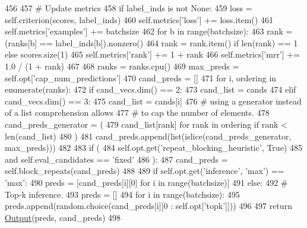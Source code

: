 \begin{DoxyCode}
456 
457         \textcolor{comment}{# Update metrics}
458         \textcolor{keywordflow}{if} label\_inds \textcolor{keywordflow}{is} \textcolor{keywordflow}{not} \textcolor{keywordtype}{None}:
459             loss = self.criterion(scores, label\_inds)
460             self.metrics[\textcolor{stringliteral}{'loss'}] += loss.item()
461             self.metrics[\textcolor{stringliteral}{'examples'}] += batchsize
462             \textcolor{keywordflow}{for} b \textcolor{keywordflow}{in} range(batchsize):
463                 rank = (ranks[b] == label\_inds[b]).nonzero()
464                 rank = rank.item() \textcolor{keywordflow}{if} len(rank) == 1 \textcolor{keywordflow}{else} scores.size(1)
465                 self.metrics[\textcolor{stringliteral}{'rank'}] += 1 + rank
466                 self.metrics[\textcolor{stringliteral}{'mrr'}] += 1.0 / (1 + rank)
467 
468         ranks = ranks.cpu()
469         max\_preds = self.opt[\textcolor{stringliteral}{'cap\_num\_predictions'}]
470         cand\_preds = []
471         \textcolor{keywordflow}{for} i, ordering \textcolor{keywordflow}{in} enumerate(ranks):
472             \textcolor{keywordflow}{if} cand\_vecs.dim() == 2:
473                 cand\_list = cands
474             \textcolor{keywordflow}{elif} cand\_vecs.dim() == 3:
475                 cand\_list = cands[i]
476             \textcolor{comment}{# using a generator instead of a list comprehension allows}
477             \textcolor{comment}{# to cap the number of elements.}
478             cand\_preds\_generator = (
479                 cand\_list[rank] \textcolor{keywordflow}{for} rank \textcolor{keywordflow}{in} ordering \textcolor{keywordflow}{if} rank < len(cand\_list)
480             )
481             cand\_preds.append(list(islice(cand\_preds\_generator, max\_preds)))
482 
483         \textcolor{keywordflow}{if} (
484             self.opt.get(\textcolor{stringliteral}{'repeat\_blocking\_heuristic'}, \textcolor{keyword}{True})
485             \textcolor{keywordflow}{and} self.eval\_candidates == \textcolor{stringliteral}{'fixed'}
486         ):
487             cand\_preds = self.block\_repeats(cand\_preds)
488 
489         \textcolor{keywordflow}{if} self.opt.get(\textcolor{stringliteral}{'inference'}, \textcolor{stringliteral}{'max'}) == \textcolor{stringliteral}{'max'}:
490             preds = [cand\_preds[i][0] \textcolor{keywordflow}{for} i \textcolor{keywordflow}{in} range(batchsize)]
491         \textcolor{keywordflow}{else}:
492             \textcolor{comment}{# Top-k inference.}
493             preds = []
494             \textcolor{keywordflow}{for} i \textcolor{keywordflow}{in} range(batchsize):
495                 preds.append(random.choice(cand\_preds[i][0 : self.opt[\textcolor{stringliteral}{'topk'}]]))
496 
497         \textcolor{keywordflow}{return} \hyperlink{namespaceparlai_1_1agents_1_1legacy__agents_1_1seq2seq_1_1torch__agent__v1_a2689006ea97d09413fb242f984bd8016}{Output}(preds, cand\_preds)
498 
\end{DoxyCode}
